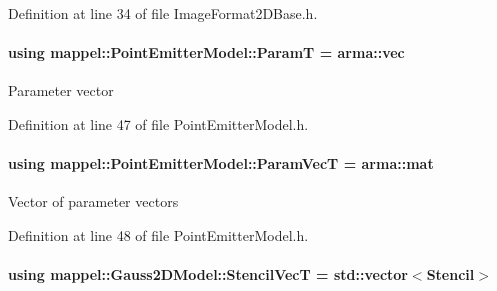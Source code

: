 Definition at line 34 of file Image\+Format2\+D\+Base.\+h.

\paragraph[{\texorpdfstring{ParamT}{ParamT}}]{\setlength{\rightskip}{0pt plus 5cm}using {\bf mappel\+::\+Point\+Emitter\+Model\+::\+ParamT} =  arma\+::vec\hspace{0.3cm}{\ttfamily [inherited]}}\hypertarget{classmappel_1_1PointEmitterModel_a665ec6aea3aac139bb69a23c06d4b9a1}{}\label{classmappel_1_1PointEmitterModel_a665ec6aea3aac139bb69a23c06d4b9a1}
Parameter vector 

Definition at line 47 of file Point\+Emitter\+Model.\+h.

\paragraph[{\texorpdfstring{Param\+VecT}{ParamVecT}}]{\setlength{\rightskip}{0pt plus 5cm}using {\bf mappel\+::\+Point\+Emitter\+Model\+::\+Param\+VecT} =  arma\+::mat\hspace{0.3cm}{\ttfamily [inherited]}}\hypertarget{classmappel_1_1PointEmitterModel_add253b568d763f1513a810aac35de719}{}\label{classmappel_1_1PointEmitterModel_add253b568d763f1513a810aac35de719}
Vector of parameter vectors 

Definition at line 48 of file Point\+Emitter\+Model.\+h.

\paragraph[{\texorpdfstring{Stencil\+VecT}{StencilVecT}}]{\setlength{\rightskip}{0pt plus 5cm}using {\bf mappel\+::\+Gauss2\+D\+Model\+::\+Stencil\+VecT} =  std\+::vector$<${\bf Stencil}$>$}\hypertarget{classmappel_1_1Gauss2DModel_acd9bb0363c841eaa629f68677ed2f214}{}\label{classmappel_1_1Gauss2DModel_acd9bb0363c841eaa629f68677ed2f214}


